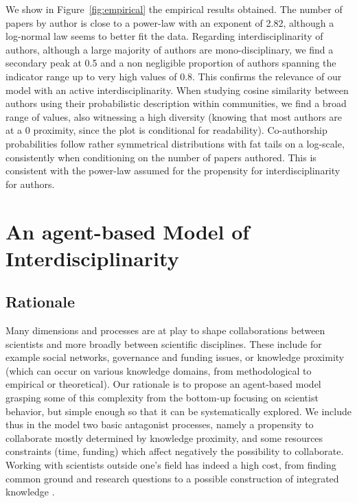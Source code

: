\documentclass[utf8]{frontiersFPHY} %
\begin{document}
We show in Figure~\ref{fig:empirical} the empirical results obtained. The number of papers by author is close to a power-law with an exponent of 2.82, although a log-normal law seems to better fit the data. Regarding interdisciplinarity of authors, although a large majority of authors are mono-disciplinary, we find a secondary peak at 0.5 and a non negligible proportion of authors spanning the indicator range up to very high values of 0.8. This confirms the relevance of our model with an active interdisciplinarity. When studying cosine similarity between authors using their probabilistic description within communities, we find a broad range of values, also witnessing a high diversity (knowing that most authors are at a 0 proximity, since the plot is conditional for readability). Co-authorship probabilities follow rather symmetrical distributions with fat tails on a log-scale, consistently when conditioning on the number of papers authored. This is consistent with the power-law assumed for the propensity for interdisciplinarity for authors.







\section{An agent-based Model of Interdisciplinarity}

\subsection{Rationale}

Many dimensions and processes are at play to shape collaborations between scientists and more broadly between scientific disciplines. These include for example social networks, governance and funding issues, or knowledge proximity (which can occur on various knowledge domains, from methodological to empirical or theoretical). Our rationale is to propose an agent-based model grasping some of this complexity from the bottom-up focusing on scientist behavior, but simple enough so that it can be systematically explored. We include thus in the model two basic antagonist processes, namely a propensity to collaborate mostly determined by knowledge proximity, and some resources constraints (time, funding) which affect negatively the possibility to collaborate. Working with scientists outside one's field has indeed a high cost, from finding common ground and research questions to a possible construction of integrated knowledge \cite{frodeman2013sustainable}.
\end{document}
